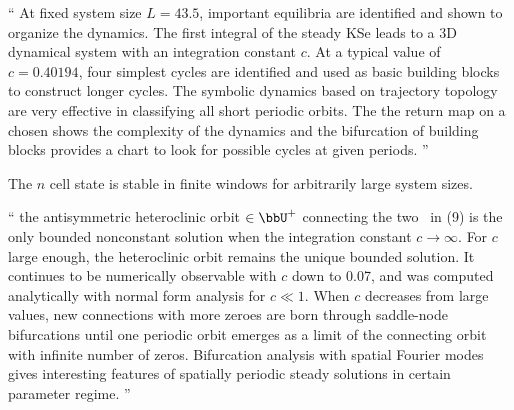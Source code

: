 `` At fixed system size $L =43.5$, important equilibria
      are identified and shown to organize the dynamics. The first
      integral of the steady KSe leads to a 3D dynamical system with an
      integration constant $c$. At a typical value of $c = 0.40194$, four
      simplest cycles are identified and used as basic building blocks to
      construct longer cycles. The symbolic dynamics based on trajectory
      topology are very effective in classifying all short periodic
      orbits. The the return map on a chosen {\PoincSec} shows the
      complexity of the dynamics and the bifurcation of building blocks
      provides a chart to look for possible cycles at given periods. ''

The $n$ cell state is stable in finite windows for
arbitrarily large system sizes.

``
the antisymmetric heteroclinic orbit $\in \bbU^+$ connecting the two \eqva\ in
(9) is the only bounded nonconstant solution when the integration
constant $c\to\infty$. For $c$ large enough, the heteroclinic
orbit remains the unique bounded solution. It continues to be
numerically observable with $c$ down to 0.07, and was
computed analytically with normal form analysis for $c\ll
1$. When $c$ decreases from large values, new connections
with more zeroes are born through saddle-node bifurcations until one
periodic orbit emerges as a limit of the connecting orbit with infinite
number of zeros. Bifurcation analysis with spatial Fourier modes gives
interesting features of spatially periodic steady solutions in certain
parameter regime.
''

